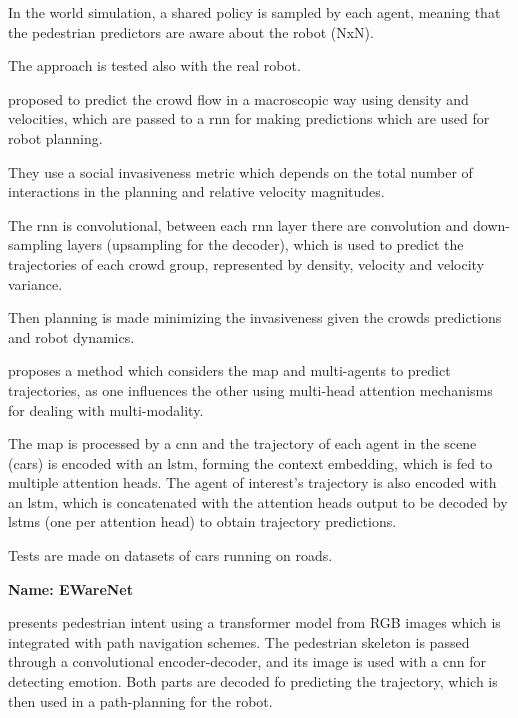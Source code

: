 In the world simulation, a shared policy is sampled by each agent, meaning that the pedestrian predictors are aware about the robot (NxN).

The approach is tested also with the real robot.
	


\cite{kiss2021probabilistic} proposed to predict the crowd flow in a macroscopic way using density and velocities, which are passed to a \gls{rnn} for making predictions which are used for robot planning.

They use a social invasiveness metric which depends on the total number of interactions in the planning and relative velocity magnitudes.

The \gls{rnn} is convolutional, between each \gls{rnn} layer there are convolution and down-sampling layers (upsampling for the decoder), which is used to predict the trajectories of each crowd group, represented by density, velocity and velocity variance.

Then planning is made minimizing the invasiveness given the crowds predictions and robot dynamics.  



\cite{messaoud2021trajectory} proposes a method which considers the map and multi-agents to predict trajectories, as one influences the other using multi-head attention mechanisms for dealing with multi-modality.

The map is processed by a \gls{cnn} and the trajectory of each agent in the scene (cars) is encoded with an \gls{lstm}, forming the context embedding, which is fed to multiple attention heads.
%
The agent of interest's trajectory is also encoded with an \gls{lstm}, which is concatenated with the attention heads output to be decoded by \glspl{lstm} (one per attention head) to obtain trajectory predictions.

Tests are made on datasets of cars running on roads.


\textbf{Name: EWareNet}

\cite{narayanan2023ewarenet} presents pedestrian intent using a transformer model from RGB images which is integrated with path navigation schemes.
%
The pedestrian skeleton is passed through a convolutional encoder-decoder, and its image is used with a \gls{cnn} for detecting emotion. 
%
Both parts are decoded fo predicting the trajectory, which is then used in a path-planning for the robot.

